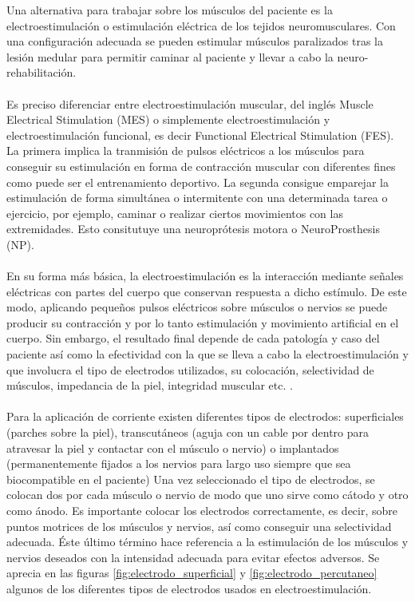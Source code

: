 Una alternativa para trabajar sobre los músculos del paciente es la electroestimulación o estimulación eléctrica de los tejidos neuromusculares. Con una configuración adecuada se pueden estimular músculos paralizados tras la lesión medular para permitir caminar al paciente y llevar a cabo la neuro-rehabilitación\cite{electroestimulacion2}.
\\
\\
Es preciso diferenciar entre electroestimulación muscular, del inglés Muscle Electrical Stimulation (MES) o simplemente electroestimulación y electroestimulación funcional, es decir Functional Electrical Stimulation (FES). La primera implica la tranmisión de pulsos eléctricos a los músculos para conseguir su estimulación en forma de contracción muscular con diferentes fines como puede ser el entrenamiento deportivo\cite{sanitas}. La segunda consigue emparejar la estimulación de forma simultánea o intermitente con una determinada tarea o ejercicio, por ejemplo, caminar o realizar ciertos movimientos con las extremidades. Esto consitutuye una neuroprótesis motora o NeuroProsthesis (NP)\cite{tesis_antonio}.
\\
\\
En su forma más básica, la electroestimulación es la interacción mediante señales eléctricas con partes del cuerpo que conservan respuesta a dicho estímulo. De este modo, aplicando pequeños pulsos eléctricos sobre músculos o nervios se puede producir su contracción y por lo tanto estimulación y movimiento artificial en el cuerpo. Sin embargo, el resultado final depende de cada patología y caso del paciente así como la efectividad con la que se lleva a cabo la electroestimulación y que involucra el tipo de electrodos utilizados, su colocación, selectividad de músculos, impedancia de la piel, integridad muscular etc. \cite{electroestimulacion}.
\\
\\
Para la aplicación de corriente existen diferentes tipos de electrodos: superficiales (parches sobre la piel), transcutáneos (aguja con un cable por dentro para atravesar la piel y contactar con el músculo o nervio) o implantados (permanentemente fijados a los nervios para largo uso siempre que sea biocompatible en el paciente)\cite{tipos_electrodos}
Una vez seleccionado el tipo de electrodos, se colocan dos por cada músculo o nervio de modo que uno sirve como cátodo y otro como ánodo. Es importante colocar los electrodos correctamente, es decir, sobre puntos motrices de los músculos y nervios, así como conseguir una selectividad adecuada. Éste último término hace referencia a la estimulación de los músculos y nervios deseados con la intensidad adecuada para evitar efectos adversos\cite{limitaciones_fes}. Se aprecia en las figuras \ref{fig:electrodo_superficial} y \ref{fig:electrodo_percutaneo} algunos de los diferentes tipos de electrodos usados en electroestimulación.\\

